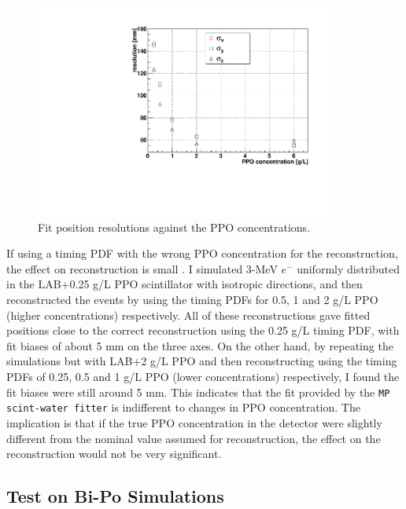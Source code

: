 \begin{figure}[!htb]
	\centering
	\includegraphics[width=10cm]{partialResolVsPPO.pdf}
	\caption{Fit position resolutions against the PPO concentrations.}
	\label{fig:partialResolVsPPO}
\end{figure}

If using a timing PDF with the wrong PPO concentration for the reconstruction, the effect on reconstruction is small \cite{partialFitterPDFtestInvulnerable}. I simulated 3-MeV $e^-$ uniformly distributed in the LAB+0.25 g/L PPO scintillator with isotropic directions, and then reconstructed the events by using the timing PDFs for 0.5, 1 and 2 g/L PPO (higher concentrations) respectively. All of these reconstructions gave fitted positions close to the correct reconstruction using the 0.25 g/L timing PDF, with fit biases of about 5 mm on the three axes. On the other hand, by repeating the simulations but with LAB+2 g/L PPO and then reconstructing using the timing PDFs of 0.25, 0.5 and 1 g/L PPO (lower concentrations) respectively, I found the fit biases were still around 5 mm. This indicates that the fit provided by the \texttt{MP scint-water fitter} is indifferent to changes in PPO concentration. The implication is that if the true PPO concentration in the detector were slightly different from the nominal value assumed for reconstruction, the effect on the reconstruction would not be very significant.

\subsection{Test on Bi-Po Simulations}\label{sect:bipo}

